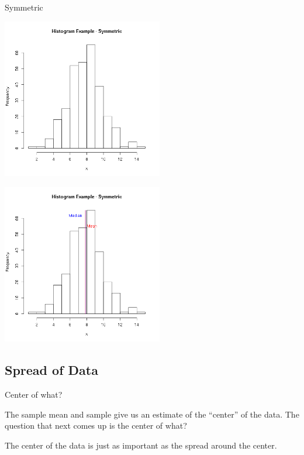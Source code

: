 \begin{frame}{Symmetric}

  {
    \includegraphics[width=7cm]{img/symmetric}
  }

  {
    \includegraphics[width=7cm]{img/symmetricAnnotated}
  }

  
\end{frame}


\subsection{Spread of Data}

\begin{frame}{Center of what?}

  The sample mean and sample give us an estimate of the ``center'' of
  the data. The question that next comes up is the center of what?

  The center of the data is just as important as the spread around the
  center.
  
\end{frame}

